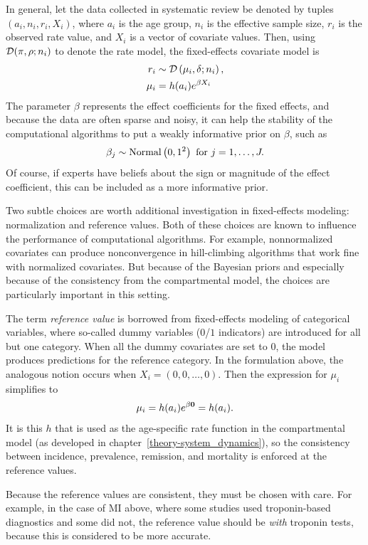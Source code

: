 In general, let the data collected in systematic review be denoted by
tuples $\left(a_i, n_i, r_i, X_i\right)$, where $a_i$ is the
age group, $n_i$ is the effective sample size, $r_i$ is the observed rate
value, and $X_i$ is a vector of covariate values. Then, using
$\mathcal{D}(\pi, \rho; n_i)$ to denote the rate model, the fixed-effects
covariate model is
\begin{align*}
r_i &\sim \mathcal{D}\left(\mu_i, \delta; n_i\right),\\
\mu_i &= h(a_i)e^{\beta X_i}
\end{align*}
The parameter $\beta$ represents the effect coefficients for
the fixed effects, and because the data are often sparse and noisy, it
can help the stability of the computational algorithms to put a weakly
informative prior on $\beta$, such as
\[
\beta_j \sim \operatorname{Normal}\left(0, 1^2\right) \text{ for } j = 1, \ldots, J.
\]
Of course, if experts have beliefs about the sign or magnitude of the
effect coefficient, this can be included as a more informative prior.

Two subtle choices are worth additional investigation in fixed-effects
modeling: normalization and reference values.  Both of these choices
are known to influence the performance of computational
algorithms.\cite{gelman_bayesian_2003} For example, nonnormalized covariates can produce
nonconvergence in hill-climbing algorithms that work fine with
normalized covariates.  But because of the Bayesian priors and
especially because of the consistency from the compartmental model,
the choices are particularly important in this setting.

The term \emph{reference value} is borrowed from fixed-effects
modeling of categorical variables, where so-called dummy variables
($0$/$1$ indicators) are introduced for all but one category. When
all the dummy covariates are set to $0$, the model produces
predictions for the reference category. In the formulation above, the
analogous notion occurs when $X_i = (0, 0, \ldots, 0)$.  Then the
expression for $\mu_i$ simplifies to
\[
\mu_i = h(a_i) e^{\beta \mathbf{0}} = h(a_i).
\]
It is this $h$ that is used as the age-specific rate function in
the compartmental model (as developed in
chapter~\ref{theory-system_dynamics}), so the consistency between
incidence, prevalence, remission, and mortality is enforced at the
reference values.

Because the reference values are consistent, they must be chosen with
care.  For example, in the case of MI above, where some studies used
troponin-based diagnostics and some did not, the reference value
should be \emph{with} troponin tests, because this is considered to be
more accurate.

